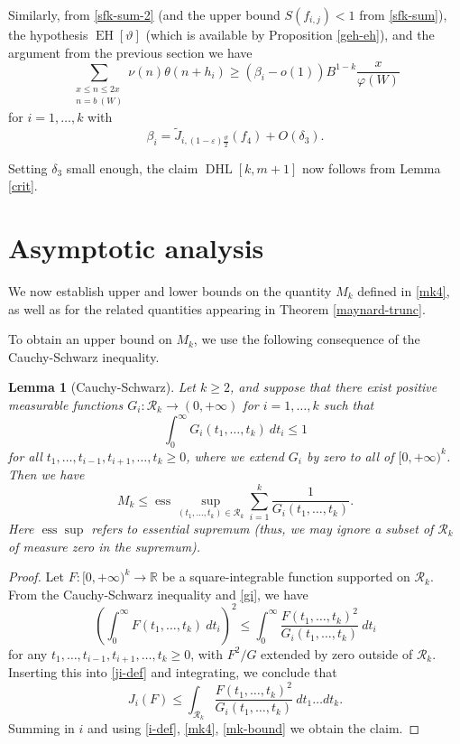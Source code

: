 \documentclass{bmcart}
\DeclareMathOperator*\EH{EH}
\DeclareMathOperator*\DHL{DHL}
\theoremstyle{plain}
\newtheorem{lemma}[theorem]{Lemma}
\theoremstyle{definition}
\newcommand\R{\mathbb{R}}
\newcommand\eps{\varepsilon}
\renewcommand{\phi}{\varphi}
\begin{document}
Similarly, from \eqref{sfk-sum-2} (and the upper bound $S(f_{i,j}) < 1$ from \eqref{sfk-sum}), the hypothesis $\EH[\vartheta]$ (which is available by Proposition \ref{geh-eh}), and the argument from the previous section we have
$$ 
 \sum_{\substack{x \leq n \leq 2x\\ n = b\ (W)}} \nu(n) \theta(n+h_i) \geq (\beta_i - o(1)) B^{1-k} \frac{x}{\phi(W)}$$
for $i=1,\dots,k$ with
$$ \beta_i = \tilde J_{i, (1-\eps) \frac{\vartheta}{2}}( f_4 ) + O(\delta_3).$$

Setting $\delta_3$ small enough, the claim $\DHL[k,m+1]$ now follows from Lemma \ref{crit}.

\section{Asymptotic analysis}\label{asymptotics-sec}

We now establish upper and lower bounds on the quantity $M_k$ defined in \eqref{mk4}, as well as for the related quantities appearing in Theorem \ref{maynard-trunc}.

To obtain an upper bound on $M_k$, we use the following consequence of the Cauchy-Schwarz inequality.

\begin{lemma}[Cauchy-Schwarz]\label{cs}  Let $k \geq 2$, and suppose that there exist positive measurable functions $G_i: {\mathcal R}_k \to (0,+\infty)$ for $i=1,\dots,k$ such that
\begin{equation}\label{gi}
 \int_0^\infty G_i(t_1,\dots,t_k)\ dt_i \leq 1
\end{equation}
for all $t_1,\dots,t_{i-1},t_{i+1},\dots,t_k \geq 0$, where we extend $G_i$ by zero to all of $[0,+\infty)^k$.  Then we have
\begin{equation}\label{mk-bound}
M_k \leq \operatorname{ess} \sup_{(t_1,\dots,t_k) \in {\mathcal R}_k} \sum_{i=1}^k \frac{1}{G_i(t_1,\dots,t_k)}.
\end{equation}
Here $\operatorname{ess} \sup$ refers to essential supremum (thus, we may ignore a subset of ${\mathcal R}_k$ of measure zero in the supremum).
\end{lemma}

\begin{proof}  Let $F: [0,+\infty)^k \to \R$ be a square-integrable function supported on ${\mathcal R}_k$.  From the Cauchy-Schwarz inequality and \eqref{gi}, we have
$$ \left(\int_0^\infty F(t_1,\dots,t_k)\ dt_i\right)^2 \leq \int_0^\infty \frac{F(t_1,\dots,t_k)^2}{G_i(t_1,\dots,t_k)} \ dt_i$$
for any $t_1,\dots,t_{i-1},t_{i+1},\dots,t_k \geq 0$, with $F^2/G$ extended by zero outside of ${\mathcal R}_k$. Inserting this into \eqref{ji-def} and integrating, we conclude that
$$ J_i(F) \leq \int_{{\mathcal R}_k} \frac{F(t_1,\dots,t_k)^2 }{G_i(t_1,\dots,t_k)}\ dt_1\dots dt_k.$$
Summing in $i$ and using \eqref{i-def}, \eqref{mk4}, \eqref{mk-bound} we obtain the claim.
\end{proof}
\end{document}
